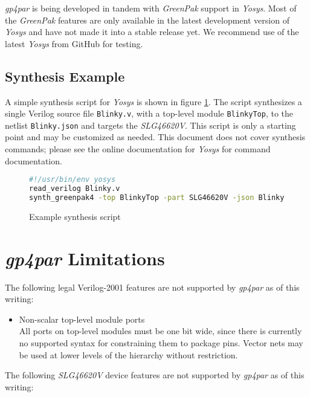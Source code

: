 \documentclass[11pt]{article}
\newcommand{\namestyle}[1]{\textit{#1}}
\newcommand{\whenstyle}[1]{{\fontseries{sb}\selectfont#1}}
\begin{document}
\namestyle{gp4par} is being developed in tandem with \namestyle{GreenPak} support in \namestyle{Yosys}. Most of the \namestyle{GreenPak} features are only available in
the latest development version of \namestyle{Yosys} and have not made it into a stable release yet. We recommend use of the latest
\namestyle{Yosys} from GitHub for testing.

\subsection{Synthesis Example}

A simple synthesis script for \namestyle{Yosys} is shown in figure \ref{yscript}. The script synthesizes a single 
Verilog source file \texttt{Blinky.v}, with a top-level module \texttt{BlinkyTop}, to the netlist \texttt{Blinky.json} 
and targets the \namestyle{SLG46620V}. This script is only a starting point and may be customized as needed. This 
document does not cover synthesis commands; please see the online documentation for \namestyle{Yosys} for command 
documentation.

\begin{figure}[h]
\begin{lstlisting}[language=sh]
#!/usr/bin/env yosys
read_verilog Blinky.v
synth_greenpak4 -top BlinkyTop -part SLG46620V -json Blinky.json
\end{lstlisting}
\caption{Example synthesis script}
\label{yscript}
\end{figure}

\pagebreak
\section{\namestyle{gp4par} Limitations}

The following legal Verilog-2001 features are not supported by \namestyle{gp4par} as of this writing:

\begin{itemize}
\item \whenstyle{Non-scalar top-level module ports}\\All ports on top-level modules must be one bit wide, since there 
is currently no supported syntax for constraining them to package pins. Vector nets may be used at lower levels of the 
hierarchy without restriction.
\end{itemize}

The following \namestyle{SLG46620V} device features are not supported by \namestyle{gp4par} as of this writing:
\end{document}
